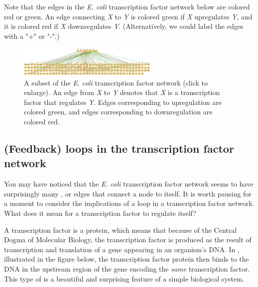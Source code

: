 Note that the edges in the \textit{E. coli} transcription factor network below are colored red or green. An edge connecting \textit{X} to \textit{Y} is colored green if \textit{X} upregulates \textit{Y}, and it is colored red if \textit{X} downregulates \textit{Y}. (Alternatively, we could label the edges with a "+" or "-".)

\begin{figure}[h]
\centering
\mySfFamily
\includegraphics[width = 0.6\textwidth]{../images/e_coli_tf_network.jpeg}
\caption{A subset of the \textit{E. coli} transcription factor network (click to enlarge). An edge from \textit{X} to \textit{Y} denotes that \textit{X} is a transcription factor that regulates \textit{Y}. Edges corresponding to upregulation are colored green, and edges corresponding to downregulation are colored red.}
\label{fig:e_coli_tf_network}
\end{figure}

\begin{qbox}\end{qbox} 

\FloatBarrier
{}
\subsection{(Feedback) loops in the transcription factor network}

You may have noticed that the \textit{E. coli} transcription factor network seems to have surprisingly many , or edges that connect a node to itself. It is worth pausing for a moment to consider the implications of a loop in a transcription factor network. What does it mean for a transcription factor to regulate itself?

A transcription factor is a protein, which means that because of the Central Dogma of Molecular Biology, the transcription factor is produced as the result of transcription and translation of a gene appearing in an organism's DNA. In , illustrated in the figure below, the transcription factor protein then binds to the DNA in the upstream region of the gene encoding the \textit{same} transcription factor. This type of  is a beautiful and surprising feature of a simple biological system.


